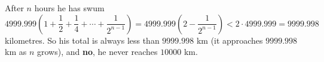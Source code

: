 After $n$ hours he has swum
\[4999.999\left(1+\dfrac{1}{2}+\dfrac{1}{4}+\cdots+\dfrac{1}{2^{n-1}}\right)=4999.999\left(2-\dfrac{1}{2^{n-1}}\right)<2\cdot4999.999=9999.998\]
kilometres. So his total is always less than $9999.998$ km (it approaches $9999.998$ km as $n$ grows), and \textbf{no}, he never reaches $10000$ km.

